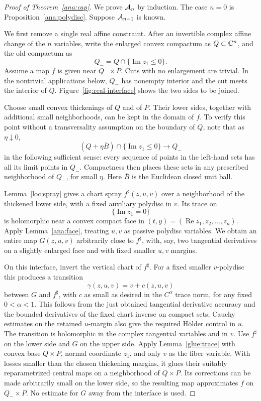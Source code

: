 \begin{proof}[Proof of Theorem~\ref{ana:cap}]
We prove \({\cal A}_n\) by induction.  The case \(n=0\) is
Proposition~\ref{ana:polydisc}.  Suppose \({\cal A}_{n-1}\)
is known.

We first remove a single real affine constraint.  After an
invertible complex affine change of the \(n\) variables, write
the enlarged convex compactum as \(Q\subset\mathbb C^n\), and the
old compactum as
\[
 Q_- = Q\cap\{\operatorname{Im}z_1\leq0\}.
\]
Assume a map \(f\) is given near \(Q_-\times P\).
Cuts with no enlargement are trivial.  In the nontrivial
applications below, \(Q_-\) has nonempty interior and the
cut meets the interior of \(Q\). Figure~\ref{fig:real-interface}
shows the two sides to be joined.



Choose small convex thickenings of \(Q\) and of \(P\).
Their lower sides, together with additional small neighborhoods,
can be kept in the domain of \(f\).  To verify this point without
a transversality assumption on the boundary of \(Q\), note that
as \(\eta\downarrow0\),
\[
 (Q+\eta\overline B)\cap\{\operatorname{Im}z_1\leq0\}
       \longrightarrow Q_-
\]
in the following sufficient sense: every sequence of points
in the left-hand sets has all its limit points in \(Q_-\).
Compactness then places these sets in any prescribed
neighborhood of \(Q_-\), for small \(\eta\).
Here \(\overline B\) is the Euclidean closed unit ball.

Lemma~\ref{loc:spray} gives a chart spray
\(f^\sharp(z,u,v)\) over a neighborhood of the thickened
lower side, with a fixed auxiliary polydisc in \(v\).
Its trace on
\[
 \{\operatorname{Im}z_1=0\}
\]
is holomorphic near a convex compact face in
\((t,y)=(\operatorname{Re}z_1,z_2,\ldots,z_n)\).
Apply Lemma~\ref{ana:face}, treating \(u,v\) as passive
polydisc variables.  We obtain an entire map \(G(z,u,v)\)
arbitrarily close to \(f^\sharp\), with, say, two tangential
derivatives on a slightly enlarged face and with fixed
smaller \(u,v\) margins.

On this interface, invert the vertical chart of \(f^\sharp\).
For a fixed smaller \(v\)-polydisc this produces a transition
\[
 \gamma(z,u,v)=v+c(z,u,v)
\]
between \(G\) and \(f^\sharp\), with \(c\) as small as desired
in the \(C^\alpha\) trace norm, for any fixed \(0<\alpha<1\).
This follows from the just obtained tangential derivative
accuracy and the bounded derivatives of the fixed chart
inverse on compact sets; Cauchy estimates on the retained
\(u\)-margin also give the required H\"older control in \(u\).
The transition is holomorphic in the complex tangential variables
and in \(v\).
Use \(f^\sharp\) on the lower side and \(G\) on the upper
side. Apply Lemma~\ref{glue:trace} with convex base \(Q\times P\),
normal coordinate \(z_1\), and only \(v\) as the fiber variable.
With losses smaller than the chosen thickening margins, it glues
their suitably reparametrized
central maps on a neighborhood of \(Q\times P\).
Its corrections can be made arbitrarily small on the lower
side, so the resulting map approximates \(f\) on \(Q_-\times P\).
No estimate for \(G\) away from the interface is used.


\end{proof}

